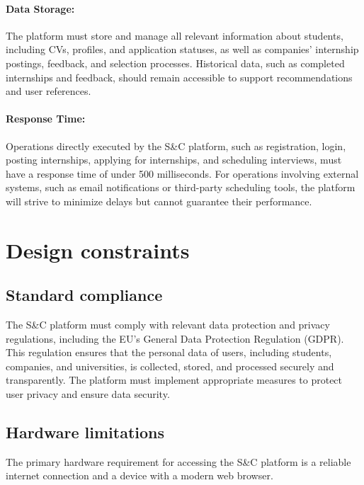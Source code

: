 \paragraph{Data Storage:}
  The platform must store and manage all relevant information about
  students, including CVs, profiles, and application statuses, as well
  as companies' internship postings, feedback, and selection processes.
  Historical data, such as completed internships and feedback, should
  remain accessible to support recommendations and user references.
\paragraph{Response Time:}
  Operations directly executed by the S\&C platform, such as
  registration, login, posting internships, applying for internships,
  and scheduling interviews, must have a response time of under 500
  milliseconds. For operations involving external systems, such as email
  notifications or third-party scheduling tools, the platform will
  strive to minimize delays but cannot guarantee their performance.

\section{Design constraints}
\label{sec:design_constraints}%


\subsection{Standard compliance}
\label{subsec:standard compliance}%


The S\&C platform must comply with relevant data protection and privacy
regulations, including the EU's General Data Protection Regulation
(GDPR). This regulation ensures that the personal data of users,
including students, companies, and universities, is collected, stored,
and processed securely and transparently. The platform must implement
appropriate measures to protect user privacy and ensure data security.


\subsection{Hardware limitations}
\label{subsec:hardware_limitations}%


The primary hardware requirement for accessing the S\&C platform is a
reliable internet connection and a device with a modern web browser.


